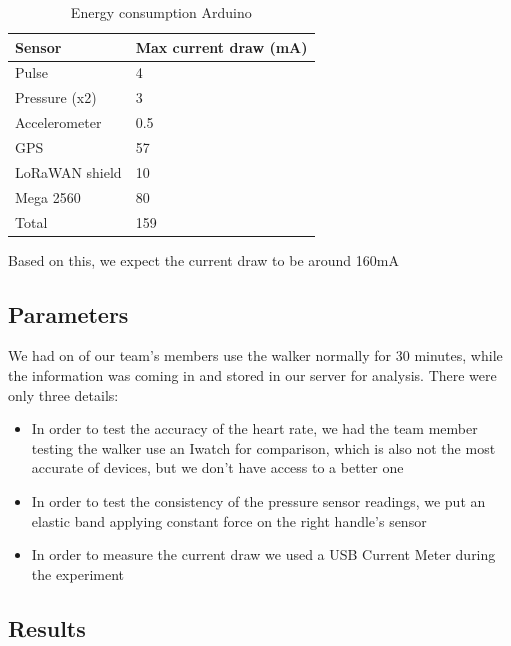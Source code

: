			\begin{table}[h]
				\begin{tabular}{@{}ll@{}}
					\toprule
					Sensor         & Max current draw (mA) \\ \midrule
					Pulse          & 4                     \\
					Pressure (x2)  & 3                     \\
					Accelerometer  & 0.5                   \\
					GPS            & 57                    \\
					LoRaWAN shield & 10                    \\
					Mega 2560      & 80                    \\
					Total          & 159                   \\ \bottomrule
				\end{tabular}
				\caption[Energy consumption Arduino]{Energy consumption Arduino}
				\label{tab:EnergyConsumption}
			\end{table}

			Based on this, we expect the current draw to be around 160mA

	\subsection*{Parameters}
		We had on of our team's members use the walker normally for 30 minutes, while the information was coming in and stored in our server for analysis. There were only three details:

		\begin{itemize}
		  \item In order to test the accuracy of the heart rate, we had the team member testing the walker use an Iwatch for comparison, which is also not the most accurate of devices, but we don't have access to a better one
		  \item In order to test the consistency of the pressure sensor readings, we put an elastic band applying constant force on the right handle's sensor
		  \item In order to measure the current draw we used a USB Current Meter during the experiment
		\end{itemize}

	\subsection*{Results}
		

